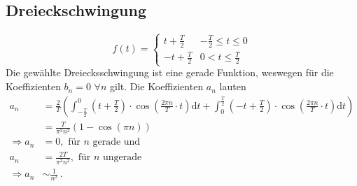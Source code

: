 \subsection{Dreieckschwingung}
\begin{equation*}
    f(t) = \begin{cases}
        t+ \frac{T}{2} & -\frac{T}{2} \leq t \leq 0\\
        -t + \frac{T}{2} & 0 < t \leq \frac{T}{2}
    \end{cases}
\end{equation*}
Die gewählte Dreiecksschwingung ist eine gerade Funktion, weswegen für die Koeffizienten $b_n = 0 \,\, \forall n$ gilt.
Die Koeffizienten $a_n$ lauten 
\begin{align*}
    a_n &= \frac{2}{T}\left(\int_{-\frac{T}{2}}^{0} (t+\frac{T}{2})\cdot \cos \left( \frac{2 \pi n}{T}\cdot t\right)\text{d}t + \int_{0}^{\frac{T}{2}}(-t+\frac{T}{2})\cdot \cos\left(\frac{2 \pi n}{T}\cdot t\right)\text{d}t\right)\\
    &= \frac{T}{{\pi}^2 n^2}\left(1-\cos\left(\pi n\right)\right)\\
    \Rightarrow a_n &= 0,\text{ für } n\text{ gerade und}\\
     a_n &= \frac{2T}{{\pi^2} n^2},\text{ für } n\text{ ungerade}\\
    \Rightarrow a_n &\sim \frac{1}{n^2}\,.
\end{align*}
